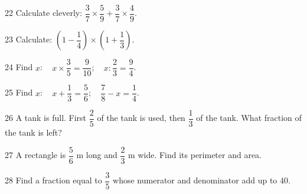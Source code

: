 \gap
\begin{probbox}{22}{\relax}
Calculate cleverly: $\dfrac37\times\dfrac59+\dfrac37\times\dfrac49$.
\end{probbox}
\gap
\begin{probbox}{23}{\relax}
Calculate: $\left(1-\dfrac14\right)\times\left(1+\dfrac13\right)$.
\end{probbox}
\gap
\begin{probbox}{24}{\relax}
Find $x$: \  $x\times\dfrac35=\dfrac9{10}$; \  $x:\dfrac23=\dfrac94$.
\end{probbox}
\gap
\begin{probbox}{25}{\relax}
Find $x$: \  $x+\dfrac13=\dfrac56$; \  $\dfrac78-x=\dfrac14$.
\end{probbox}
\gap
\begin{probbox}{26}{\relax}
A tank is full. First $\dfrac25$ of the tank is used, then $\dfrac13$ of the tank. What fraction of the tank is left?
\end{probbox}
\gap
\begin{probbox}{27}{\relax}
A rectangle is $\dfrac56$ m long and $\dfrac23$ m wide. Find its perimeter and area.
\end{probbox}
\gap
\begin{probbox}{28}{\relax}
Find a fraction equal to $\dfrac35$ whose numerator and denominator add up to $40$.
\end{probbox}
